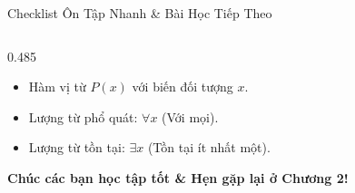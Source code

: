 \documentclass[aspectratio=169, 10pt]{beamer}
\begin{document}
\begin{frame}{Checklist Ôn Tập Nhanh \& Bài Học Tiếp Theo}
\begin{columns}[t, onlytextwidth]
\begin{column}{0.485\textwidth}
\begin{cozyInsight}
\begin{itemize}
          \begin{itemize}
            \setlength{\itemsep}{1pt}
            \item Hàm vị từ $P(x)$ với biến đối tượng $x$.
            \item Lượng từ phổ quát: \textbf{$\forall x$} (Với mọi).
            \item Lượng từ tồn tại: \textbf{$\exists x$} (Tồn tại ít nhất một).
          \end{itemize}
        \end{itemize}
        \par\vspace{0.1cm}
        \centering\textbf{\color{cozyWarm}Chúc các bạn học tập tốt \& Hẹn gặp lại ở Chương 2!}
      \end{cozyInsight}
    \end{column}
  \end{columns}
\end{frame}
\end{document}
